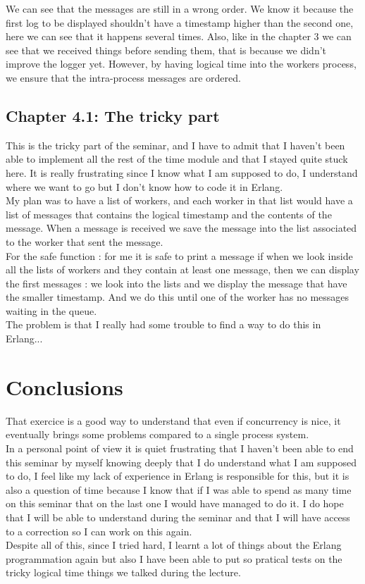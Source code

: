 \documentclass[a4paper, 11pt]{article}
\begin{document}
We can see that the messages are still in a wrong order. We know it because the first log to be displayed shouldn't have a timestamp higher than the second one, here we can see that it happens several times. Also, like in the chapter 3 we can see that we received things before sending them, that is because we didn't improve the logger yet. 
However, by having logical time into the workers process, we ensure that the intra-process messages are ordered.

\subsection{Chapter 4.1: The tricky part}
This is the tricky part of the seminar, and I have to admit that I haven't been able to implement all the rest of the time module and that I stayed quite stuck here. It is really frustrating since I know what I am supposed to do, I understand where we want to go but I don't know how to code it in Erlang. \\

My plan was to have a list of workers, and each worker in that list would have a list of messages that contains the logical timestamp and the contents of the message. When a message is received we save the message into the list associated to the worker that sent the message. \\
For the safe function : for me it is safe to print a message if when we look inside all the lists of workers and they contain at least one message, then we can display the first messages : we look into the lists and we display the message that have the smaller timestamp. And we do this until one of the worker has no messages waiting in the queue. \\
The problem is that I really had some trouble to find a way to do this in Erlang...

\section{Conclusions}
That exercice is a good way to understand that even if concurrency is nice, it eventually brings some problems compared to a single process system.\\
In a personal point of view it is quiet frustrating that I haven't been able to end this seminar by myself knowing deeply that I do understand what I am supposed to do, I feel like my lack of experience in Erlang is responsible for this, but it is also a question of time because I know that if I was able to spend as many time on this seminar that on the last one I would have managed to do it. I do hope that I will be able to understand during the seminar and that I will have access to a correction so I can work on this again. \\
Despite all of this, since I tried hard, I learnt a lot of things about the Erlang programmation again but also I have been able to put so pratical tests on the tricky logical time things we talked during the lecture.
\end{document}
